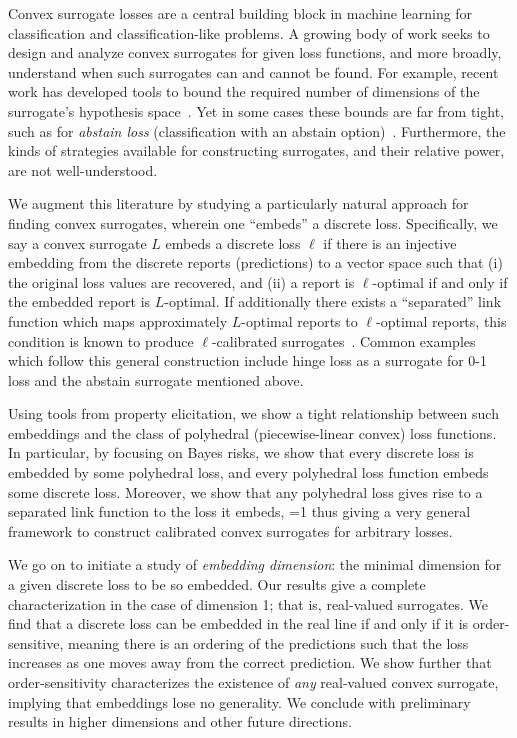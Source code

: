 \documentclass[12pt]{article}
\newcommand{\Comments}{1}
\newcommand{\mytodo}[2]{\ifnum\Comments=1%
  \todo[linecolor=#1!80!black,backgroundcolor=#1,bordercolor=#1!80!black]{#2}\fi}
\newcommand{\raft}[1]{\mytodo{green!20!white}{RF: #1}}
\begin{document}
Convex surrogate losses are a central building block in machine learning for classification and classification-like problems.
A growing body of work seeks to design and analyze convex surrogates for given loss functions, and more broadly, understand when such surrogates can and cannot be found.
For example, recent work has developed tools to bound the required number of dimensions of the surrogate's hypothesis space~\cite{frongillo2015elicitation,  ramaswamy2016convex}.
Yet in some cases these bounds are far from tight, such as for \emph{abstain loss} (classification with an abstain option)~\cite{bartlett2008classification, yuan2010classification, ramaswamy2016convex, ramaswamy2018consistent}.
Furthermore, the kinds of strategies available for constructing surrogates, and their relative power, are not well-understood.

We augment this literature by studying a particularly natural approach for finding convex surrogates, wherein one ``embeds'' a discrete loss.
Specifically, we say a convex surrogate $L$ embeds a discrete loss $\ell$ if there is an injective embedding from the discrete reports (predictions) to a vector space such that (i) the original loss values are recovered, and (ii) a report is $\ell$-optimal if and only if the embedded report is $L$-optimal.
If additionally there exists a ``separated'' link function which maps approximately $L$-optimal reports to $\ell$-optimal reports, this condition is known to produce $\ell$-calibrated surrogates~\cite{agarwal2015consistent}.
Common examples which follow this general construction include hinge loss as a surrogate for 0-1 loss and the abstain surrogate mentioned above.

Using tools from property elicitation, we show a tight relationship between such embeddings and the class of polyhedral (piecewise-linear convex) loss functions.
In particular, by focusing on Bayes risks, we show that every discrete loss is embedded by some polyhedral loss, and every polyhedral loss function embeds some discrete loss.
Moreover, we show that any polyhedral loss gives rise to a separated link function to the loss it embeds, \raft{TODO: prove this :-]}
thus giving a very general framework to construct calibrated convex surrogates for arbitrary losses.

We go on to initiate a study of \emph{embedding dimension}: the minimal dimension for a given discrete loss to be so embedded.
Our results give a complete characterization in the case of dimension 1; that is, real-valued surrogates.
We find that a discrete loss can be embedded in the real line if and only if it is order-sensitive, meaning there is an ordering of the predictions such that the loss increases as one moves away from the correct prediction.
We show further that order-sensitivity characterizes the existence of \emph{any} real-valued convex surrogate, implying that embeddings lose no generality.
We conclude with preliminary results in higher dimensions and other future directions.
\end{document}
